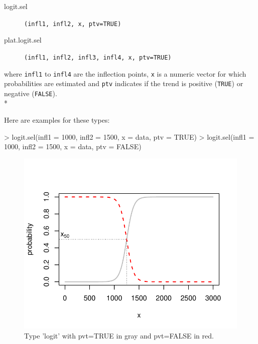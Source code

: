 \documentclass[letterpaper, 12pt]{article}
\begin{document}
\begin{description}
\item[logit.sel]\verb#(infl1, infl2, x, ptv=TRUE)#
\item[plat.logit.sel]\verb#(infl1, infl2, infl3, infl4, x, ptv=TRUE)#
\end{description}
where \verb#infl1# to \verb#infl4# are the inflection points, \verb#x# is a numeric vector for which probabilities are 
estimated and \verb#ptv# indicates if the trend is positive  (\verb#TRUE#) or negative (\verb#FALSE#).\\*

Here are examples for these types:

\begin{Schunk}
\begin{Sinput}
> logit.sel(infl1 = 1000, infl2 = 1500, x = data, ptv = TRUE)
> logit.sel(infl1 = 1000, infl2 = 1500, x = data, ptv = FALSE)
\end{Sinput}
\end{Schunk}
\begin{figure}[h]
\begin{center}
\includegraphics{relation_sel-010}
\end{center}
\caption{Type 'logit' with pvt=TRUE in gray and pvt=FALSE in red.}
\label{fig5}
\end{figure}
\end{document}
